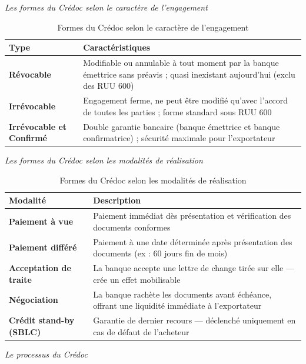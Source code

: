 \medskip\textit{Les formes du Crédoc selon le caractère de l'engagement}

\begin{table}[h!]
\centering
\begin{tabularx}{\textwidth}{>{\bfseries}l X}
\toprule
Type & Caractéristiques \\
\midrule
Révocable & Modifiable ou annulable à tout moment par la banque émettrice sans préavis ; quasi inexistant aujourd'hui (exclu des RUU 600) \\
\addlinespace
Irrévocable & Engagement ferme, ne peut être modifié qu'avec l'accord de toutes les parties ; forme standard sous RUU 600 \\
\addlinespace
Irrévocable et Confirmé & Double garantie bancaire (banque émettrice et banque confirmatrice) ; sécurité maximale pour l'exportateur \\
\bottomrule
\end{tabularx}
\caption{Formes du Crédoc selon le caractère de l'engagement}
\end{table}

\medskip\textit{Les formes du Crédoc selon les modalités de réalisation}

\begin{table}[h!]
\centering
\begin{tabularx}{\textwidth}{>{\bfseries}l X}
\toprule
Modalité & Description \\
\midrule
Paiement à vue & Paiement immédiat dès présentation et vérification des documents conformes \\
Paiement différé & Paiement à une date déterminée après présentation des documents (ex : 60 jours fin de mois) \\
Acceptation de traite & La banque accepte une lettre de change tirée sur elle --- crée un effet mobilisable \\
Négociation & La banque rachète les documents avant échéance, offrant une liquidité immédiate à l'exportateur \\
Crédit stand-by (SBLC) & Garantie de dernier recours --- déclenché uniquement en cas de défaut de l'acheteur \\
\bottomrule
\end{tabularx}
\caption{Formes du Crédoc selon les modalités de réalisation}
\end{table}

\medskip\textit{Le processus du Crédoc}

